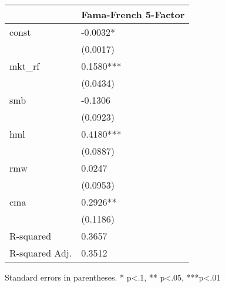\begin{table}
\caption{}
\label{}
\begin{center}
\begin{tabular}{ll}
\hline
               & Fama-French 5-Factor  \\
\hline
const          & -0.0032*              \\
               & (0.0017)              \\
mkt\_rf        & 0.1580***             \\
               & (0.0434)              \\
smb            & -0.1306               \\
               & (0.0923)              \\
hml            & 0.4180***             \\
               & (0.0887)              \\
rmw            & 0.0247                \\
               & (0.0953)              \\
cma            & 0.2926**              \\
               & (0.1186)              \\
R-squared      & 0.3657                \\
R-squared Adj. & 0.3512                \\
\hline
\end{tabular}
\end{center}
\end{table}
\bigskip
Standard errors in parentheses. \newline 
* p<.1, ** p<.05, ***p<.01